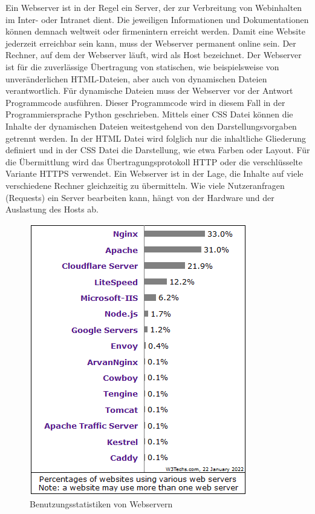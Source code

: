 Ein Webserver ist in der Regel ein Server, der zur Verbreitung von Webinhalten im Inter- oder Intranet dient. Die jeweiligen Informationen und Dokumentationen können demnach weltweit oder firmenintern erreicht werden. Damit eine Website jederzeit erreichbar sein kann, muss der Webserver permanent online sein.
Der Rechner, auf dem der Webserver läuft, wird als Host bezeichnet. Der Webserver ist für die zuverlässige Übertragung von statischen, wie beispielsweise von unveränderlichen \ac{HTML}-Dateien, aber auch von dynamischen Dateien verantwortlich. Für dynamische Dateien muss der Webserver vor der Antwort Programmcode ausführen. Dieser Programmcode wird in diesem Fall in der Programmiersprache Python geschrieben. Mittels einer \ac{CSS} Datei können die Inhalte der dynamischen Dateien weitestgehend von den Darstellungsvorgaben getrennt werden. In der \ac{HTML} Datei wird folglich nur die inhaltliche Gliederung definiert und in der \ac{CSS} Datei die Darstellung, wie etwa Farben oder Layout.
Für die Übermittlung wird das Übertragungsprotokoll \ac{HTTP} oder die verschlüsselte Variante \ac{HTTPS} verwendet.
Ein Webserver ist in der Lage, die Inhalte auf viele verschiedene Rechner gleichzeitig zu übermitteln. Wie viele Nutzeranfragen (Requests) ein Server bearbeiten kann, hängt von der Hardware und der Auslastung des Hosts ab.

\begin{figure}[htbp]
	\centering
	\includegraphics{images/StatistikWebserver.png}
	\caption{Benutzungsstatistiken von Webservern \cite{w3techs}}
	\label{fig:WebserverStatistik}
\end{figure}

